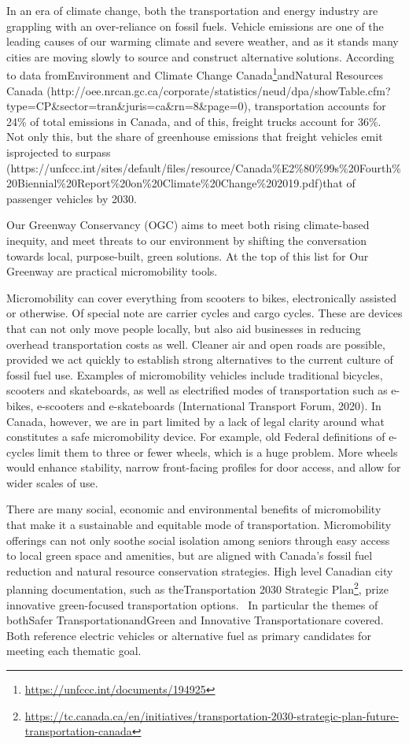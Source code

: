 \documentclass[letter]{ourGreenwayBrand}
\begin{document}
\MakeBrandTitle

In an era of climate change, both the transportation and energy industry are grappling with an over-reliance on fossil fuels. Vehicle emissions are one of the leading causes of our warming climate and severe weather, and as it stands many cities are moving slowly to source and construct alternative solutions. According to data fromEnvironment and Climate Change Canada\footnote{\url{https://unfccc.int/documents/194925}}andNatural Resources Canada (http://oee.nrcan.gc.ca/corporate/statistics/neud/dpa/showTable.cfm?type=CP\&sector=tran\&juris=ca\&rn=8\&page=0), transportation accounts for 24\% of total emissions in Canada, and of this, freight trucks account for 36\%. Not only this, but the share of greenhouse emissions that freight vehicles emit isprojected to surpass (https://unfccc.int/sites/default/files/resource/Canada\%E2\%80\%99s\%20Fourth\%20Biennial\%20Report\%20on\%20Climate\%20Change\%202019.pdf)that of passenger vehicles by 2030.

Our Greenway Conservancy (OGC) aims to meet both rising climate-based inequity, and meet threats to our environment by shifting the conversation towards local, purpose-built, green solutions. At the top of this list for Our Greenway are practical micromobility tools.

Micromobility can cover everything from scooters to bikes, electronically assisted or otherwise. Of special note are carrier cycles and cargo cycles. These are devices that can not only move people locally, but also aid businesses in reducing overhead transportation costs as well. Cleaner air and open roads are possible, provided we act quickly to establish strong alternatives to the current culture of fossil fuel use. Examples of micromobility vehicles include traditional bicycles, scooters and skateboards, as well as electrified modes of transportation such as e-bikes, e-scooters and e-skateboards (International Transport Forum, 2020). In Canada, however, we are in part limited by a lack of legal clarity around what constitutes a safe micromobility device. For example, old Federal definitions of e-cycles limit them to three or fewer wheels, which is a huge problem. More wheels would enhance stability, narrow front-facing profiles for door access, and allow for wider scales of use.

There are many social, economic and environmental benefits of micromobility that make it a sustainable and equitable mode of transportation. Micromobility offerings can not only soothe social isolation among seniors through easy access to local green space and amenities, but are aligned with Canada’s fossil fuel reduction and natural resource conservation strategies. High level Canadian city planning documentation, such as theTransportation 2030 Strategic Plan\footnote{\url{https://tc.canada.ca/en/initiatives/transportation-2030-strategic-plan-future-transportation-canada}}, prize innovative green-focused transportation options.  In particular the themes of  bothSafer TransportationandGreen and Innovative Transportationare covered. Both reference electric vehicles or alternative fuel as primary candidates for meeting each thematic goal.
\end{document}
